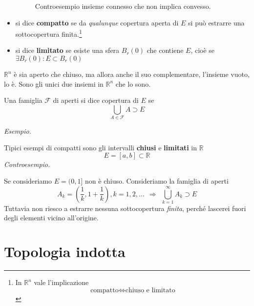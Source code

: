 \documentclass[10pt,a4paper,twoside,openright]{book}
\begin{document}
\begin{itemize}
\begin{figure}[htpb]
	\caption{Controesempio insieme connesso che non implica convesso.}
\end{figure}
\FloatBarrier
\item si dice \textbf{compatto} se da \textit{qualunque} copertura aperta di $E$ si può estrarre una sottocopertura finita.\footnote{In $\displaystyle \mathbb{R}^{n}$ vale l'implicazione
\begin{equation*}
\text{compatto} \Leftrightarrow \text{chiuso e limitato}
\end{equation*}}
\item si dice \textbf{limitato} se esiste una sfera $B_{r}(0)$ che contiene $E$, cioè se $\displaystyle \exists B_{r}(0) :E\subset B_{r}(0)$
\end{itemize}
\begin{nb}
$\mathbb{R}^{n}$ è sia aperto che chiuso, ma allora anche il suo complementare, l'insieme vuoto, lo è. Sono gli unici due insiemi in $\mathbb{R}^{n}$ che lo sono.
\end{nb}
\begin{definition}
[Copertura] Una famiglia $\mathcal{F}$ di aperti si dice copertura di $E$ se
\begin{equation*}
\bigcup _{A\in \mathcal{F}} A\supset E
\end{equation*}
\end{definition}
\textit{Esempio.}

Tipici esempi di compatti sono gli intervalli \textbf{chiusi} e \textbf{limitati} in $\mathbb{R}$
\begin{equation*}
E=[ a,b] \subset \mathbb{R}
\end{equation*}
\textit{Controesempio.}

Se consideriamo $\displaystyle E=( 0,1]$ non è chiuso. Consideriamo la famiglia di aperti
\begin{equation*}
A_{k} =\left(\frac{1}{k},1+\frac{1}{k}\right),k=1,2,\dotsc \ \ \Rightarrow \ \ \bigcup ^{\infty }_{k=1} A_{k} \supset E
\end{equation*}
Tuttavia non riesco a estrarre nessuna sottocopertura \textit{finita}, perché lascerei fuori degli elementi vicino all'origine.
\section{Topologia indotta}
\end{document}

